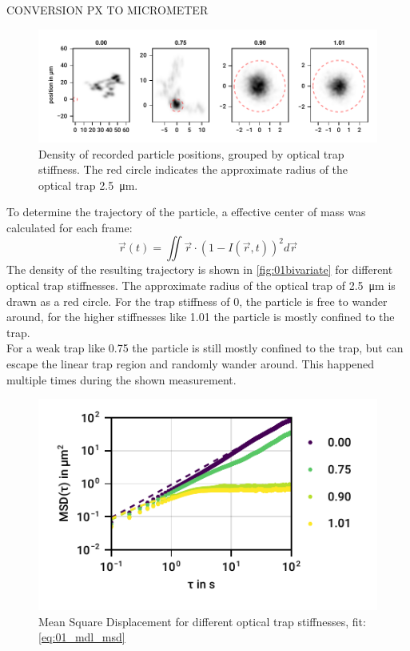 \documentclass[
    parskip=half, 
    twoside=false,
    twocolumn=true,
    fontsize=11pt,
]{scrarticle}
\begin{document}
CONVERSION PX TO MICROMETER

\begin{figure}
    \centering
    \includegraphics{figures/01_03_1_bivariate.pdf}
    \caption{Density of recorded particle positions, grouped by optical trap stiffness. The red circle indicates the approximate radius of the optical trap \SI{2.5}{\micro m}.}
    \label{fig:01bivariate}
\end{figure}
To determine the trajectory of the particle, a effective center of mass was calculated for each frame:
\begin{equation}
    \vec{r}(t) = \iint \vec{r} \cdot \left(1-I(\vec{r}, t)\right)^2 d\vec{r}    
\end{equation}
The density of the resulting trajectory is shown in \autoref{fig:01bivariate} for different optical trap stiffnesses.
The approximate radius of the optical trap of \SI{2.5}{\micro m} is drawn as a red circle.
For the trap stiffness of \SI{0}{}, the particle is free to wander around, for the higher stiffnesses like \SI{1.01}{} the particle is mostly confined to the trap.\\
For a weak trap like \SI{0.75}{} the particle is still mostly confined to the trap, but can escape the linear trap region and randomly wander around. 
This happened multiple times during the shown measurement.

\begin{figure}
    \centering
    \includegraphics{figures/01_02_2_msd.pdf}
    \caption{Mean Square Displacement for different optical trap stiffnesses, fit: \autoref{eq:01_mdl_msd}}
    \label{fig:01msd}
\end{figure}
\end{document}
